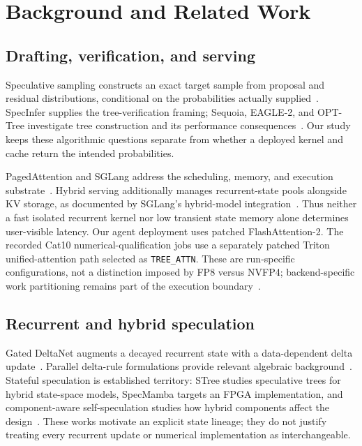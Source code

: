 \documentclass[conference]{IEEEtran}
\begin{document}
\section{Background and Related Work}
\label{sec:related}
\subsection{Drafting, verification, and serving}
Speculative sampling constructs an exact target sample from proposal and residual distributions, conditional on the probabilities actually supplied~\cite{leviathan2023fast,chen2023sampling}. SpecInfer supplies the tree-verification framing; Sequoia, EAGLE-2, and OPT-Tree investigate tree construction and its performance consequences~\cite{miao2023specinfer,chen2024sequoia,li2024eagle,wang2024opt}. Our study keeps these algorithmic questions separate from whether a deployed kernel and cache return the intended probabilities.

PagedAttention and SGLang address the scheduling, memory, and execution substrate~\cite{kwon2023efficient,zheng2024sglang}. Hybrid serving additionally manages recurrent-state pools alongside KV storage, as documented by SGLang's hybrid-model integration~\cite{pytorch2025sglang,sglang2026qwen}. Thus neither a fast isolated recurrent kernel nor low transient state memory alone determines user-visible latency. Our agent deployment uses patched FlashAttention-2. The recorded Cat10 numerical-qualification jobs use a separately patched Triton unified-attention path selected as \texttt{TREE\_ATTN}. These are run-specific configurations, not a distinction imposed by FP8 versus NVFP4; backend-specific work partitioning remains part of the execution boundary~\cite{dao2023flashattention,lumo2026archive}.

\subsection{Recurrent and hybrid speculation}
Gated DeltaNet augments a decayed recurrent state with a data-dependent delta update~\cite{yang2024gated}. Parallel delta-rule formulations provide relevant algebraic background~\cite{yang2024delta}. Stateful speculation is established territory: STree studies speculative trees for hybrid state-space models, SpecMamba targets an FPGA implementation, and component-aware self-speculation studies how hybrid components affect the design~\cite{wu2025stree,zhong2025specmamba,borobia2026component}. These works motivate an explicit state lineage; they do not justify treating every recurrent update or numerical implementation as interchangeable.
\end{document}
